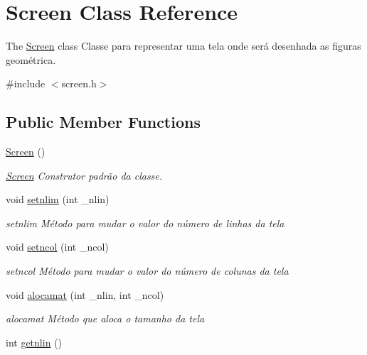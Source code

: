 \hypertarget{class_screen}{}\section{Screen Class Reference}
\label{class_screen}


The \mbox{\hyperlink{class_screen}{Screen}} class Classe para representar uma tela onde será desenhada as figuras geométrica.  




{\ttfamily \#include $<$screen.\+h$>$}

\subsection*{Public Member Functions}
\begin{DoxyCompactItemize}
\item 
\mbox{\label{class_screen_ae7576476fc6e6a6eaa66389fdc41fe72}} 
\mbox{\hyperlink{class_screen_ae7576476fc6e6a6eaa66389fdc41fe72}{Screen}} ()
\begin{DoxyCompactList}\small\item\em \mbox{\hyperlink{class_screen}{Screen}} Construtor padrão da classe. \end{DoxyCompactList}\item 
void \mbox{\hyperlink{class_screen_ac4d187efda643cfc9127230d6363c721}{setnlim}} (int \+\_\+nlin)
\begin{DoxyCompactList}\small\item\em setnlim Método para mudar o valor do número de linhas da tela \end{DoxyCompactList}\item 
void \mbox{\hyperlink{class_screen_a07a26006fcf8b8169af511f1eff03a04}{setncol}} (int \+\_\+ncol)
\begin{DoxyCompactList}\small\item\em setncol Método para mudar o valor do número de colunas da tela \end{DoxyCompactList}\item 
void \mbox{\hyperlink{class_screen_a3570e45d7dbc261cc4da471259a66d7a}{alocamat}} (int \+\_\+nlin, int \+\_\+ncol)
\begin{DoxyCompactList}\small\item\em alocamat Método que aloca o tamanho da tela \end{DoxyCompactList}\item 
int \mbox{\hyperlink{class_screen_ac247e58a4575bbafa46b9f9d24841538}{getnlin}} ()

\end{DoxyCompactItemize}
